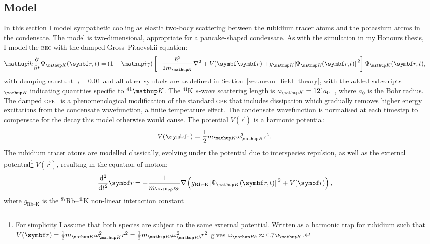 \subsection{Model}

In this section I model sympathetic cooling as elastic two-body scattering between the rubidium tracer atoms and the potassium atoms in the condensate. The model is two-dimensional, appropriate for a pancake-shaped condensate. As with the simulation in my Honours thesis, I model the \textsc{bec} with the damped Gross--Pitaevskii equation:
\begin{align}
\ii\hbar\pdv{t} \Psi_\up{K}(\vec r, t) = (1-\ii\gamma)\left[-\frac{\hbar^2}{2m_\up{K}}\nabla^2 + V(\vec{\vec r}) + g_\up{K}\abs{\Psi_\up{K}(\vec r, t)}^2\right]\Psi_\up{K}(\vec r, t),
\end{align}
with damping constant $\gamma=0.01$ and all other symbols are as defined in Section~\ref{sec:mean_field_theory}, with the added subscripts $_\up{K}$ indicating quantities specific to $^{41}\up{K}$. The $^{41}$K $s$-wave scattering length is $a_\up{K}=121 a_0$~\cite{cote_potassium_1998}, where $a_0$ is the Bohr radius. The damped \textsc{gpe}~\cite{tsubota_vortex_2002, madarassy_vortex_2008} is a phenomenological modification of the standard \textsc{gpe} that includes dissipation which gradually removes higher energy excitations from the condensate wavefunction, a finite temperature effect. The condensate wavefunction is normalised at each timestep to compensate for the decay this model otherwise would cause. The potential $V(\vec r)$ is a harmonic potential:
\begin{align}
V(\vec r) = \frac12m_\up{K}\omega_\up{K}^2 r^2.
\end{align}
The rubidium tracer atoms are modelled classically, evolving under the potential due to interspecies repulsion, as well as the external potential\footnote{For simplicity I assume that both species are subject to the same external potential. Written as a harmonic trap for rubidium such that $V(\vec r) = \frac12m_\up{K}\omega_\up{K}^2 r^2 = \frac12m_\up{Rb}\omega_\up{Rb}^2 r^2$ gives $\omega_\up{Rb} \approx 0.7\omega_\up{K}$.} $V(\vec r)$, resulting in the equation of motion:
\begin{align}\label{eq:classical_motion_tracers}
\dv[2]{t} \vec r = -\frac1{m_\up{Rb}}\nabla\left({g_{\textrm{Rb--K}}} \abs{\Psi_\up{K}(\vec r, t)}^2 + V(\vec r)\right),
\end{align}
where $g_{\textrm{Rb--K}}$ is the $^{87}$Rb--$^{41}$K non-linear interaction constant
